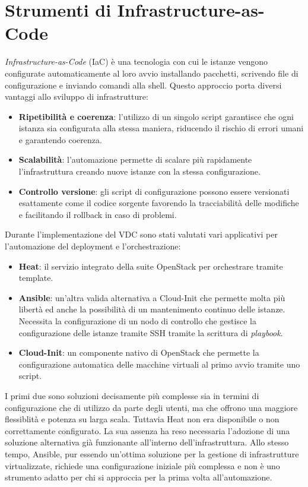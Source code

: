 \documentclass[12pt,a4paper,openright,twoside]{book}
\begin{document}
\section{Strumenti di Infrastructure-as-Code}
\textit{Infrastructure-as-Code} (IaC) è una tecnologia con cui le istanze vengono configurate automaticamente al loro avvio installando pacchetti, scrivendo file di configurazione e inviando comandi alla shell.
Questo approccio porta diversi vantaggi allo sviluppo di infrastrutture:
\begin{itemize}
    \item{
        \textbf{Ripetibilità e coerenza}: l'utilizzo di un singolo script garantisce che ogni istanza sia configurata alla stessa maniera,
        riducendo il rischio di errori umani e garantendo coerenza.
    }
    \item{
        \textbf{Scalabilità}: l'automazione permette di scalare più rapidamente l'infrastruttura creando nuove istanze con la stessa configurazione.
    }
    \item{
        \textbf{Controllo versione}: gli script di configurazione possono essere versionati esattamente come il codice sorgente favorendo la tracciabilità delle modifiche e facilitando il rollback in caso di problemi.
    }
\end{itemize}

Durante l'implementazione del VDC sono stati valutati vari applicativi per l'automazione del deployment e l'orchestrazione:
\begin{itemize}
    \item \textbf{Heat}: il servizio integrato della suite OpenStack per orchestrare tramite template.
    \item {
        \textbf{Ansible}: un'altra valida alternativa a Cloud-Init che permette molta più libertà ed anche la possibilità di un mantenimento continuo delle istanze. 
        Necessita la configurazione di un nodo di controllo che gestisce la configurazione delle istanze tramite SSH tramite la scrittura di \textit{playbook}.
    }
    \item{
        \textbf{Cloud-Init}: un componente nativo di OpenStack che permette la configurazione automatica delle macchine virtuali al primo avvio tramite uno script. 
    }
\end{itemize}

I primi due sono soluzioni decisamente più complesse sia in termini di configurazione che di utilizzo da parte degli utenti, ma che offrono una maggiore flessiblità e potenza su larga scala.
Tuttavia Heat non era disponibile o non correttamente configurato. La sua assenza ha reso necessaria l'adozione di una soluzione alternativa già funzionante all'interno dell'infrastruttura.
Allo stesso tempo, Ansible, pur essendo un'ottima soluzione per la gestione di infrastrutture virtualizzate, richiede una configurazione iniziale più complessa e non è uno strumento adatto per chi si approccia
per la prima volta all'automazione.
\end{document}
